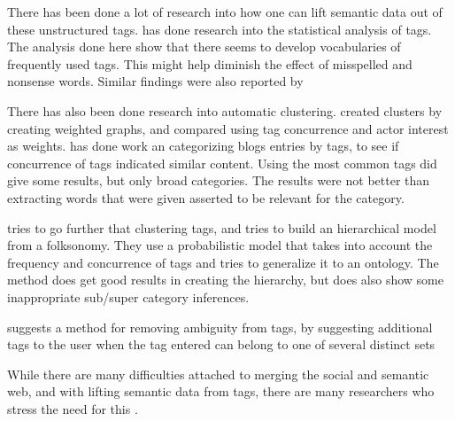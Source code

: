 There has been done a lot of research into how one can lift semantic data out of these unstructured tags.
\citet{Golder2005} has done research into the statistical analysis of tags.
The analysis done here show that there seems to develop vocabularies of frequently used tags.
This might help diminish the effect of misspelled and nonsense words. Similar findings were also reported by \citep{Shirky2007}

There has also been done research into automatic clustering.
\citet{Mika2005} created clusters by creating weighted graphs, and compared using tag concurrence and actor interest as weights.
\citet{Brooks2006} has done work an categorizing blogs entries by tags, to see if concurrence of tags indicated similar content.
Using the most common tags did give some results, but only broad categories. The results were not better than extracting words that were given asserted to be relevant for the category.

\citep{Tang2009} tries to go further that clustering tags, and tries to build an hierarchical model from a folksonomy.
They use a probabilistic model that takes into account the frequency and concurrence of tags and tries to generalize it to an ontology.
The method does get good results in creating the hierarchy, but does also show some inappropriate sub/super category inferences.

\citet{Weinberger2008} suggests a method for removing ambiguity from tags,
 by suggesting additional tags to the user when the tag entered can belong to one of several distinct sets

While there are many difficulties attached to merging the social and semantic web,
and with lifting semantic data from tags, there are many researchers who stress the need for this \citep{Passant2007,Mika2005, Gruber2007}.

